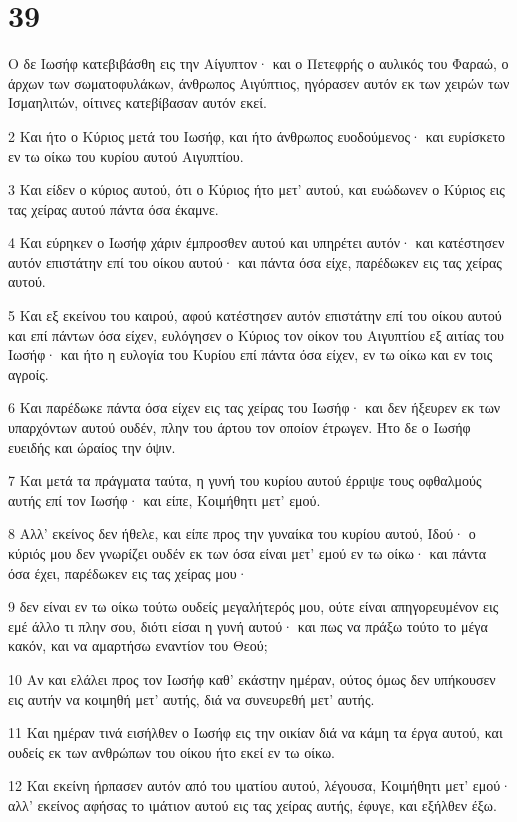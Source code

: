 \chapter{39}

\par Ο δε Ιωσήφ κατεβιβάσθη εις την Αίγυπτον· και ο Πετεφρής ο αυλικός του Φαραώ, ο άρχων των σωματοφυλάκων, άνθρωπος Αιγύπτιος, ηγόρασεν αυτόν εκ των χειρών των Ισμαηλιτών, οίτινες κατεβίβασαν αυτόν εκεί.
\par 2 Και ήτο ο Κύριος μετά του Ιωσήφ, και ήτο άνθρωπος ευοδούμενος· και ευρίσκετο εν τω οίκω του κυρίου αυτού Αιγυπτίου.
\par 3 Και είδεν ο κύριος αυτού, ότι ο Κύριος ήτο μετ' αυτού, και ευώδωνεν ο Κύριος εις τας χείρας αυτού πάντα όσα έκαμνε.
\par 4 Και εύρηκεν ο Ιωσήφ χάριν έμπροσθεν αυτού και υπηρέτει αυτόν· και κατέστησεν αυτόν επιστάτην επί του οίκου αυτού· και πάντα όσα είχε, παρέδωκεν εις τας χείρας αυτού.
\par 5 Και εξ εκείνου του καιρού, αφού κατέστησεν αυτόν επιστάτην επί του οίκου αυτού και επί πάντων όσα είχεν, ευλόγησεν ο Κύριος τον οίκον του Αιγυπτίου εξ αιτίας του Ιωσήφ· και ήτο η ευλογία του Κυρίου επί πάντα όσα είχεν, εν τω οίκω και εν τοις αγροίς.
\par 6 Και παρέδωκε πάντα όσα είχεν εις τας χείρας του Ιωσήφ· και δεν ήξευρεν εκ των υπαρχόντων αυτού ουδέν, πλην του άρτου τον οποίον έτρωγεν. Ήτο δε ο Ιωσήφ ευειδής και ώραίος την όψιν.
\par 7 Και μετά τα πράγματα ταύτα, η γυνή του κυρίου αυτού έρριψε τους οφθαλμούς αυτής επί τον Ιωσήφ· και είπε, Κοιμήθητι μετ' εμού.
\par 8 Αλλ' εκείνος δεν ήθελε, και είπε προς την γυναίκα του κυρίου αυτού, Ιδού· ο κύριός μου δεν γνωρίζει ουδέν εκ των όσα είναι μετ' εμού εν τω οίκω· και πάντα όσα έχει, παρέδωκεν εις τας χείρας μου·
\par 9 δεν είναι εν τω οίκω τούτω ουδείς μεγαλήτερός μου, ούτε είναι απηγορευμένον εις εμέ άλλο τι πλην σου, διότι είσαι η γυνή αυτού· και πως να πράξω τούτο το μέγα κακόν, και να αμαρτήσω εναντίον του Θεού;
\par 10 Αν και ελάλει προς τον Ιωσήφ καθ' εκάστην ημέραν, ούτος όμως δεν υπήκουσεν εις αυτήν να κοιμηθή μετ' αυτής, διά να συνευρεθή μετ' αυτής.
\par 11 Και ημέραν τινά εισήλθεν ο Ιωσήφ εις την οικίαν διά να κάμη τα έργα αυτού, και ουδείς εκ των ανθρώπων του οίκου ήτο εκεί εν τω οίκω.
\par 12 Και εκείνη ήρπασεν αυτόν από του ιματίου αυτού, λέγουσα, Κοιμήθητι μετ' εμού· αλλ' εκείνος αφήσας το ιμάτιον αυτού εις τας χείρας αυτής, έφυγε, και εξήλθεν έξω.
